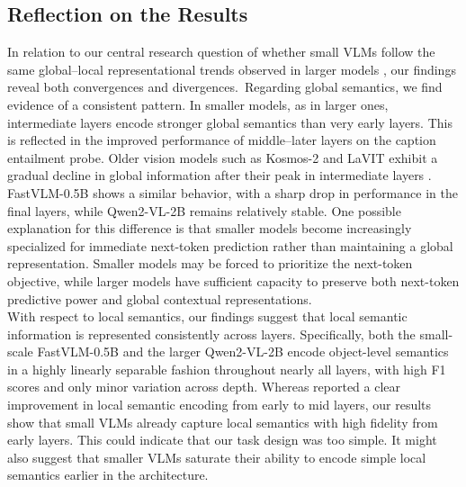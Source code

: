 \documentclass[11pt]{article}
\begin{document}
\subsection{Reflection on the Results}
In relation to our central research question of whether small VLMs follow the same global–local representational trends observed in larger models \cite{tao2024probingmultimodallargelanguage}, our findings reveal both convergences and divergences.\
Regarding global semantics, we find evidence of a consistent pattern.
In smaller models, as in larger ones, intermediate layers encode stronger global semantics than very early layers.
This is reflected in the improved performance of middle–later layers on the caption entailment probe.
Older vision models such as Kosmos-2 and LaVIT exhibit a gradual decline in global information after their peak in intermediate layers \cite{tao2024probingmultimodallargelanguage}.
FastVLM-0.5B shows a similar behavior, with a sharp drop in performance in the final layers, while Qwen2-VL-2B remains relatively stable.
One possible explanation for this difference is that smaller models become increasingly specialized for immediate next-token prediction rather than maintaining a global representation.
Smaller models may be forced to prioritize the next-token objective, while larger models have sufficient capacity to preserve both next-token predictive power and global contextual representations.\\
With respect to local semantics, our findings suggest that local semantic information is represented consistently across layers.
Specifically, both the small-scale FastVLM-0.5B and the larger Qwen2-VL-2B encode object-level semantics in a highly linearly separable fashion throughout nearly all layers, with high F1 scores and only minor variation across depth.
Whereas \cite{tao2024probingmultimodallargelanguage} reported a clear improvement in local semantic encoding from early to mid layers, our results show that small VLMs already capture local semantics with high fidelity from early layers.
This could indicate that our task design was too simple.
It might also suggest that smaller VLMs saturate their ability to encode simple local semantics earlier in the architecture.
\end{document}
